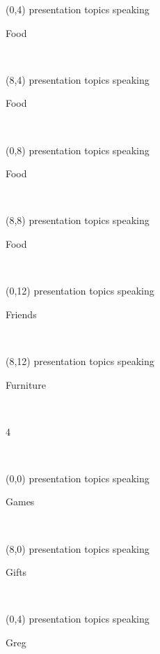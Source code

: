 \documentclass[a4paper]{article}
\newcommand{\mycard}[5]{%
	\small #1 #2
	\par
	\parbox[t][6.7cm][c]{9.5cm}{%
	\hspace{0.1cm} \Large#3\\
	\normalsize#4 #5
	}
}
\begin{document}
\begin{textblock}{8}(0,4)
\mycard{presentation topics}{speaking}{\parbox{9.0cm}{
\centering Food       
}}{}{} 
\end{textblock}

\begin{textblock}{8}(8,4)
\mycard{presentation topics}{speaking}{\parbox{9.0cm}{
\centering Food       
}}{}{} 
\end{textblock}

\begin{textblock}{8}(0,8)
\mycard{presentation topics}{speaking}{\parbox{9.0cm}{
\centering Food        
}}{}{} 
\end{textblock}

\begin{textblock}{8}(8,8)
\mycard{presentation topics}{speaking}{\parbox{9.0cm}{
\centering Food        
}}{}{} 
\end{textblock}

\begin{textblock}{8}(0,12)
\mycard{presentation topics}{speaking}{\parbox{9.0cm}{
\centering Friends      
}}{}{} 
\end{textblock}

\begin{textblock}{8}(8,12)
\mycard{presentation topics}{speaking}{\parbox{9.0cm}{
\centering Furniture  
}}{}{} 
\end{textblock}

\begin{tiny}4\end{tiny}\\
\newpage

\begin{textblock}{8}(0,0)
\mycard{presentation topics}{speaking}{\parbox{9.0cm}{
\centering Games   
}}{}{} 
\end{textblock}

\begin{textblock}{8}(8,0)
\mycard{presentation topics}{speaking}{\parbox{9.0cm}{
\centering Gifts        
}}{}{} 
\end{textblock}

\begin{textblock}{8}(0,4)
\mycard{presentation topics}{speaking}{\parbox{9.0cm}{
\centering Greg         
}}{}{} 
\end{textblock}
\end{document}
